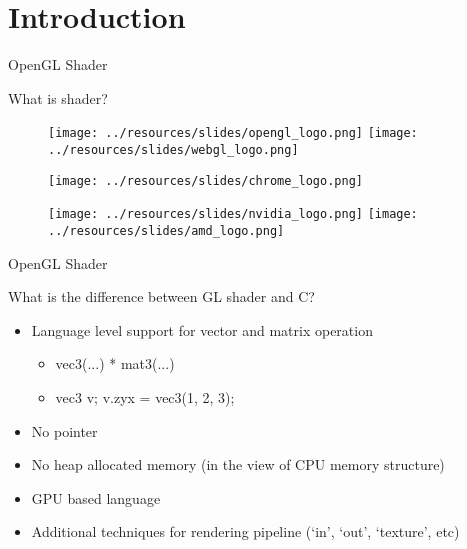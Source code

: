 \section{Introduction}

\begin{frame}{OpenGL Shader}

    What is shader?

    \begin{figure}
        \texttt{[image: ../resources/slides/opengl\_logo.png]}
        \texttt{[image: ../resources/slides/webgl\_logo.png]}
    \end{figure}

    \begin{figure}
        \texttt{[image: ../resources/slides/chrome\_logo.png]}
    \end{figure}

    \begin{figure}
        \texttt{[image: ../resources/slides/nvidia\_logo.png]}
        \texttt{[image: ../resources/slides/amd\_logo.png]}
    \end{figure}

\end{frame}

\begin{frame}{OpenGL Shader}

    What is the difference between GL shader and C?

    \begin{itemize}
        \item Language level support for vector and matrix operation
              \begin{itemize}
                  \item vec3(...) * mat3(...)
                  \item vec3 v; v.zyx = vec3(1, 2, 3);
              \end{itemize}
        \item No pointer
        \item No heap allocated memory (in the view of CPU memory structure)
        \item GPU based language
        \item Additional techniques for rendering pipeline (`in', `out', `texture', etc)
    \end{itemize}

\end{frame}


